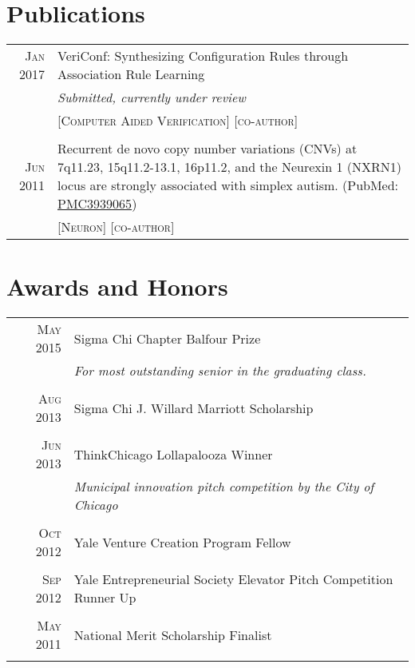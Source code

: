 \documentclass[a4paper,10pt]{article}
\begin{document}
\section{Publications}
\begin{tabular}{rp{11cm}}
 \textsc{Jan} 2017 & VeriConf: Synthesizing Configuration Rules through Association Rule Learning\\
 								& \small\emph{Submitted, currently under review} \\
 							    & \textsc{[Computer Aided Verification]} \textsc{[co-author]} \\
\multicolumn{2}{c}{} \\
 \textsc{Jun} 2011 & Recurrent de novo copy number variations (CNVs) at 7q11.23, 15q11.2-13.1, 16p11.2, and the Neurexin 1 (NXRN1) locus are strongly associated with simplex autism. (PubMed: \href{https://www.ncbi.nlm.nih.gov/pmc/articles/PMC3939065/}{PMC3939065}) \\
 							   & \textsc{[Neuron]} \textsc{[co-author]} 
\end{tabular}

\section{Awards and Honors}
\begin{tabular}{rp{11cm}}
 \textsc{May} 2015 & Sigma Chi Chapter Balfour Prize \\
 							    & \small\emph{For most outstanding senior in the graduating class.} \\
 \multicolumn{2}{c}{} \\
 \textsc{Aug} 2013 & Sigma Chi J. Willard Marriott Scholarship \\
 \multicolumn{2}{c}{} \\
 \textsc{Jun} 2013 & ThinkChicago Lollapalooza Winner \\
 							    & \small\emph{Municipal innovation pitch competition by the City of Chicago} \\
 \multicolumn{2}{c}{} \\
 \textsc{Oct} 2012 & Yale Venture Creation Program Fellow \\
 \multicolumn{2}{c}{} \\	
 \textsc{Sep} 2012 & Yale Entrepreneurial Society Elevator Pitch Competition Runner Up \\
 \multicolumn{2}{c}{} \\
 \textsc{May} 2011 & National Merit Scholarship Finalist \\
 \multicolumn{2}{c}{} \\
\end{tabular}
\end{document}
